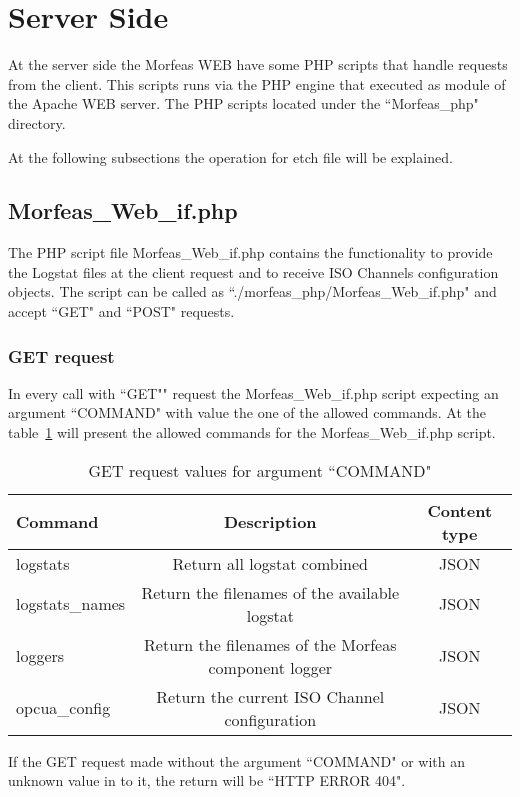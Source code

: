\section{Server Side}
At the server side the Morfeas WEB have some PHP scripts that handle requests from the client. This scripts runs via the PHP engine that executed as module of the Apache WEB server.
The PHP scripts located under the ``Morfeas\_php" directory.

At the following subsections the operation for etch file will be explained.

\subsection{Morfeas\_Web\_if.php}
The PHP script file Morfeas\_Web\_if.php contains the functionality to provide the Logstat files at the client request and to receive ISO Channels configuration objects.
The script can be called as ``./morfeas\_php/Morfeas\_Web\_if.php" and accept ``GET" and ``POST" requests.
\subsubsection{GET request}
In every call with ``GET"" request the Morfeas\_Web\_if.php script expecting an argument ``COMMAND" with value the one of the allowed commands.
At the table~\ref{table:Morfeas_Web_if} will present the allowed commands for the Morfeas\_Web\_if.php script.

\begin{table}[h]
\centering
\begin{tabular}{|l|c|c|}
 \hline
 \textbf{Command} & \textbf{Description} & \textbf{Content type}\\
 \hline
 logstats & Return all logstat combined & JSON \\
 logstats\_names & Return the filenames of the available logstat & JSON \\
 loggers & Return the filenames of the Morfeas component logger & JSON \\
 opcua\_config & Return the current ISO Channel configuration & JSON\\
 \hline
\end{tabular}
\caption{GET request values for argument ``COMMAND"}
\label{table:Morfeas_Web_if}
\end{table}

If the GET request made without the argument ``COMMAND" or with an unknown value in to it, the return will be ``HTTP ERROR 404".

